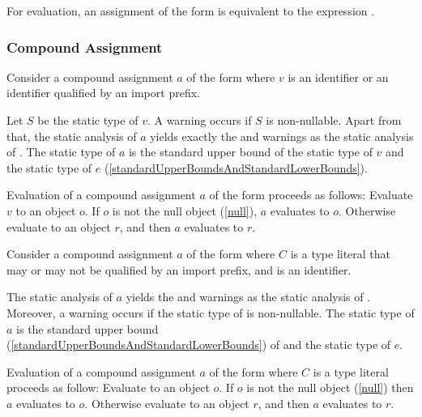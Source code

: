 \documentclass[makeidx]{article}
\begin{document}
\LMHash{}%
For evaluation, an assignment of the form 
is equivalent to the expression .
\EndCase


\subsubsection{Compound Assignment}

\LMHash{}%
Consider a compound assignment $a$ of the form 
where $v$ is an identifier or an identifier qualified by an import prefix.

\LMHash{}%
Let $S$ be the static type of $v$.
A warning occurs if $S$ is non-nullable.
Apart from that,
the static analysis of $a$ yields
exactly the  and warnings as
the static analysis of .
The static type of $a$ is
the standard upper bound of the static type of $v$ and the static type of $e$
(\ref{standardUpperBoundsAndStandardLowerBounds}).

\LMHash{}%
Evaluation of a compound assignment $a$ of the form 
proceeds as follows:
Evaluate $v$ to an object $o$.
If $o$ is not the null object (\ref{null}), $a$ evaluates to $o$.
Otherwise evaluate  to an object $r$,
and then $a$ evaluates to $r$.
\EndCase

\LMHash{}%
Consider a compound assignment $a$ of the form 
where $C$ is a type literal
that may or may not be qualified by an import prefix,
and \id{} is an identifier.

\LMHash{}%
The static analysis of $a$ yields
the  and warnings as
the static analysis of .
Moreover, a warning occurs if
the static type of  is non-nullable.
The static type of $a$ is the standard upper bound
(\ref{standardUpperBoundsAndStandardLowerBounds})
of  and the static type of $e$.

\LMHash{}%
Evaluation of a compound assignment $a$ of the form 
where $C$ is a type literal proceeds as follow:
Evaluate  to an object $o$.
If $o$ is not the null object (\ref{null}) then $a$ evaluates to $o$.
Otherwise evaluate  to an object $r$,
and then $a$ evaluates to $r$.
\EndCase
\end{document}
